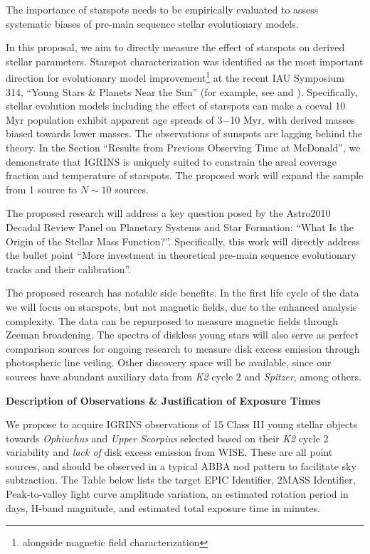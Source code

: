\documentclass[11pt,aas_macros]{article}
\begin{document}
The importance of starspots needs to be empirically evaluated to assess systematic biases of pre-main sequence stellar evolutionary models.

In this proposal, we aim to directly measure the effect of starspots on derived stellar parameters.  Starspot characterization was identified as the most important direction for evolutionary model improvement\footnote{alongside magnetic field characterization} at the recent IAU Symposium 314, ``Young Stars \& Planets Near the Sun'' (for example, see \citet{2015ApJ...807..174S} and \citet{2015arXiv150706460F}).  Specifically, stellar evolution models including the effect of starspots can make a coeval 10 Myr population exhibit apparent age spreads of 3$-$10 Myr, with derived masses biased towards lower masses.  The observations of sunspots are lagging behind the theory.  In the Section ``Results from Previous Observing Time at McDonald'', we demonstrate that IGRINS is uniquely suited to constrain the areal coverage fraction and temperature of starspots.  The proposed work will expand the sample from 1 source to $N\sim10$ sources.

The proposed research will address a key question posed by the Astro2010 Decadal Review Panel on Planetary Systems and Star Formation: ``What Is the Origin of the Stellar Mass Function?''.  Specifically, this work will directly address the bullet point ``More investment in theoretical pre-main sequence evolutionary tracks and their calibration''.

The proposed research has notable side benefits.  In the first life cycle of the data we will focus on starspots, but not magnetic fields, due to the enhanced analysis complexity.  The data can be repurposed to measure magnetic fields through Zeeman broadening.  The spectra of diskless young stars will also serve as perfect comparison sources for ongoing research to measure disk excess emission through photospheric line veiling.  Other discovery space will be available, since our sources have abundant auxiliary data from \emph{K2} cycle 2 and \emph{Spitzer}, among others.


\newpage
\begin{center}{\bf Description of Observations \& Justification of Exposure Times}
\end{center}

We propose to acquire IGRINS observations of 15 Class III young stellar objects towards \emph{Ophiuchus} and \emph{Upper Scorpius} selected based on their \emph{K2} cycle 2 variability and \emph{lack of} disk excess emission from WISE.  These are all point sources, and should be observed in a typical ABBA nod pattern to facilitate sky subtraction.  The Table below lists the target EPIC Identifier, 2MASS Identifier, Peak-to-valley light curve amplitude variation, an estimated rotation period in days, H-band magnitude, and estimated total exposure time in minutes.  \\
\end{document}
